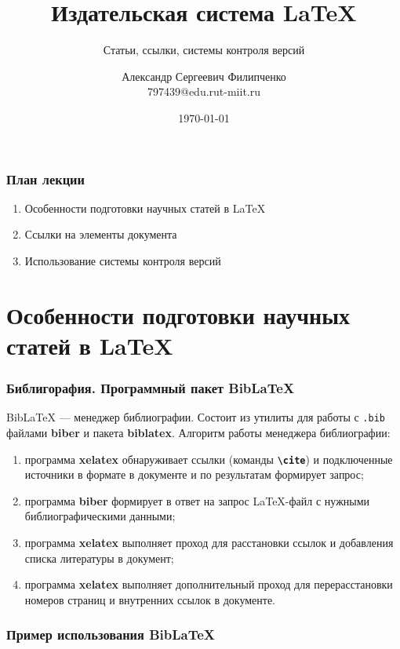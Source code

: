 \documentclass[aspectratio=169]{beamer}
\title[Заголовок]{Издательская система \LaTeX{}}
\subtitle{Статьи, ссылки, системы контроля версий}
\author[Имя автора]{Александр Сергеевич Филипченко \\ \smallskip \scriptsize 797439@edu.rut-miit.ru\\}
\institute{кафедра <<Вычислительные системы, сети и информационная безопасность>>}
\date{\today}
\begin{document}

\frame[plain]{\titlepage}	%

\begin{frame}
\frametitle{План лекции}
\begin{enumerate} 
\item Особенности подготовки научных статей в \LaTeX{}
\item Ссылки на элементы документа
\item Использование системы контроля версий
\end{enumerate} 
\end{frame}

\section{Особенности подготовки научных статей в \LaTeX{}}

\begin{frame}
\frametitle{Библигорафия. Программный пакет BibLaTeX}
BibLaTeX --- менеджер библиографии.
Состоит из утилиты для работы с \texttt{.bib} файлами \textbf{biber} и пакета \textbf{biblatex}.
Алгоритм работы менеджера библиографии:
\begin{enumerate} 
\item программа \textbf{xelatex} обнаруживает ссылки (команды \texttt{\textbf{\textbackslash cite}}) и подключенные источники в формате в документе и по результатам формирует запрос;
\item программа \textbf{biber} формирует в ответ на запрос LaTeX-файл с нужными библиографическими данными;
\item программа \textbf{xelatex} выполняет проход для расстановки ссылок и добавления списка литературы в документ;
\item программа \textbf{xelatex} выполняет дополнительный проход для перерасстановки номеров страниц и внутренних ссылок в документе.
\end{enumerate} 
\end{frame}

\begin{frame}
\frametitle{Пример использования BibLaTeX}
\end{frame}
\end{document}

